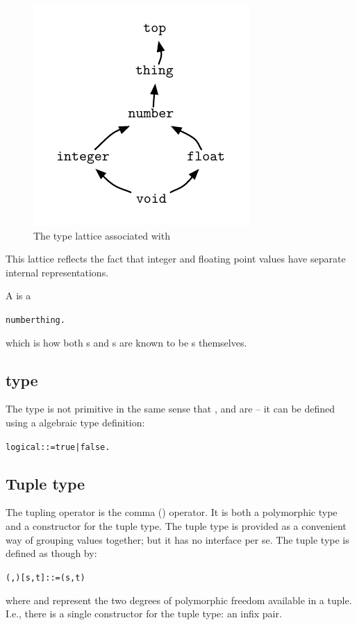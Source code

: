 \begin{figure}
\centerline{\includegraphics{number}}
\caption{\label{type:number}The type lattice associated with }
\end{figure}

This lattice reflects the fact that integer and floating point values have separate internal representations.

A  is a 
\begin{alltt}
number \impl thing.
\end{alltt}
which is how both s and s are known to be s themselves.

\subsection{ type}
\label{types:logical}
The  type is not primitive in the same sense that ,  and  are -- it can be defined using a \go algebraic type definition:
\begin{alltt}
logical ::= true | false.
\end{alltt}

\subsection{Tuple type}
\label{types:tuple}
The tupling operator is the comma (\q{,}) operator. It is both a polymorphic type and a constructor for the tuple type. The tuple type is provided as a convenient way of grouping values together; but it has no interface per se. The tuple type is defined as though by:
\begin{alltt}
(,)[s,t] ::= (s,t)
\end{alltt}
where  and  represent the two degrees of polymorphic freedom available in a tuple. I.e., there is a single constructor for the tuple type: an infix \q{,} pair.

